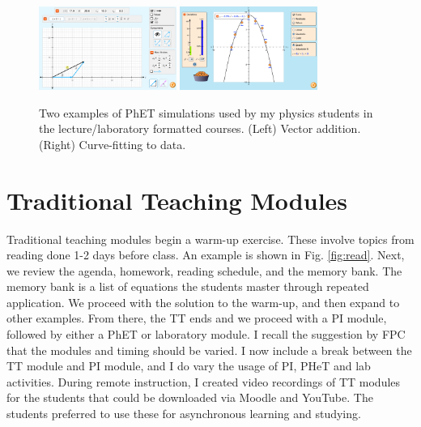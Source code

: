 \documentclass[../../../main.tex]{subfiles}
\begin{document}
\begin{figure}
\centering
\includegraphics[width=0.4\textwidth]{figures/phet1.png}
\includegraphics[width=0.4\textwidth]{figures/phet2.png}
\caption{\label{fig:phet} Two examples of PhET simulations used by my physics students in the lecture/laboratory formatted courses.  (Left) Vector addition. (Right) Curve-fitting to data.}
\end{figure}

\section{Traditional Teaching Modules}
\label{sec:tt}

Traditional teaching modules begin a warm-up exercise.  These involve topics from reading done 1-2 days before class.  An example is shown in Fig. \ref{fig:read}.  Next, we review the agenda, homework, reading schedule, and the memory bank.  The memory bank is a list of equations the students master through repeated application.  We proceed with the solution to the warm-up, and then expand to other examples.  From there, the TT ends and we proceed with a PI module, followed by either a PhET or laboratory module.  I recall the suggestion by FPC that the modules and timing should be varied.  I now include a break between the TT module and PI module, and I do vary the usage of PI, PHeT and lab activities.  During remote instruction, I created video recordings of TT modules for the students that could be downloaded via Moodle and YouTube.  The students preferred to use these for asynchronous learning and studying.
\end{document}
